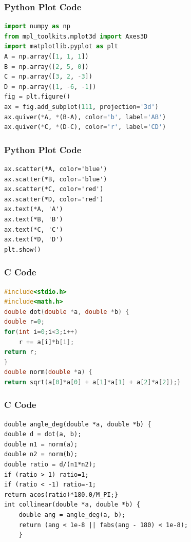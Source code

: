 \documentclass{beamer}
\begin{document}
\begin{frame}[fragile]
\frametitle{Python Plot Code}
\begin{lstlisting}[language=Python]
import numpy as np
from mpl_toolkits.mplot3d import Axes3D
import matplotlib.pyplot as plt
A = np.array([1, 1, 1])
B = np.array([2, 5, 0])
C = np.array([3, 2, -3])
D = np.array([1, -6, -1])
fig = plt.figure()
ax = fig.add_subplot(111, projection='3d')
ax.quiver(*A, *(B-A), color='b', label='AB')
ax.quiver(*C, *(D-C), color='r', label='CD')
\end{lstlisting} 
\end{frame}
\begin{frame}[fragile]
\frametitle{Python Plot Code}

\begin{lstlisting}
ax.scatter(*A, color='blue')
ax.scatter(*B, color='blue')
ax.scatter(*C, color='red')
ax.scatter(*D, color='red')
ax.text(*A, 'A')
ax.text(*B, 'B')
ax.text(*C, 'C')
ax.text(*D, 'D')
plt.show()
\end{lstlisting}
\end{frame}

\begin{frame}[fragile]
\frametitle{C Code}
\begin{lstlisting}[language=C]
#include<stdio.h>
#include<math.h>
double dot(double *a, double *b) {
double r=0;
for(int i=0;i<3;i++)
    r += a[i]*b[i];
return r;
}
double norm(double *a) {
return sqrt(a[0]*a[0] + a[1]*a[1] + a[2]*a[2]);}
\end{lstlisting} 
\end{frame}
\begin{frame}[fragile]
\frametitle{C Code}

\begin{lstlisting}
double angle_deg(double *a, double *b) {
double d = dot(a, b);
double n1 = norm(a);
double n2 = norm(b);
double ratio = d/(n1*n2);
if (ratio > 1) ratio=1;
if (ratio < -1) ratio=-1;
return acos(ratio)*180.0/M_PI;}
int collinear(double *a, double *b) {
    double ang = angle_deg(a, b);
    return (ang < 1e-8 || fabs(ang - 180) < 1e-8);
    }
\end{lstlisting}
\end{frame}
\end{document}
